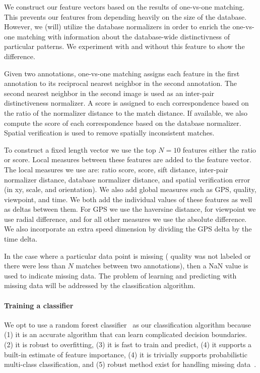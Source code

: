 We construct our feature vectors based on the results of one-vs-one matching.
This prevents our features from depending heavily on the size of the database.
However, we (will) utilize the database normalizers in order to enrich the
  one-vs-one matching with information about the database-wide distinctivness of
  particular patterns.
We experiment with and without this feature to show the difference.


Given two annotations, one-vs-one matching assigns each feature in the first
  annotation to its reciprocal nearest neighbor in the second annotation.
The second nearest neighbor in the second image is used as an inter-pair
  distinctiveness normalizer.
A score is assigned to each correspondence based on the ratio of the
  normalizer distance to the match distance.
If available, we also compute the \LNBNN{} score of each correspondence based
  on the database normalizer.
Spatial verification is used to remove spatially inconsistent matches.

To construct a fixed length vector we use the top $N=10$ features \wrt{}
  either the ratio or \LNBNN{} score.
Local measures between these features are added to the feature vector.
The local measures we use are:
ratio score, \LNBNN{} score, sift distance, inter-pair normalizer distance,
  database normalizer distance, and spatial verification error (in xy, scale,
  and orientation).
We also add global measures such as GPS, quality, viewpoint, and time.
We both add the individual values of these features as well as deltas between
  them.
For GPS we use the haversine distance, for viewpoint we use radial difference,
  and for all other measures we use the absolute difference.
We also incorporate an extra speed dimension by dividing the GPS delta by the
  time delta.

In the case where a particular data point is missing (\ie{} quality was not
  labeled or there were less than $N$ matches between two annotations), then a
  NaN value is used to indicate missing data.
The problem of learning and predicting with missing data will be addressed by
  the classification algorithm.


\paragraph{Training a classifier}
 
We opt to use a random forest
  classifier~\cite{ho_random_1995,amit_shape_1997,breiman_random_2001} as our
  classification algorithm because
(1) it is an accurate algorithm that can learn complicated decision
  boundaries.
(2) it is robust to overfitting,
(3) it is fast to train and predict,
(4) it supports a built-in estimate of feature importance,
(4) it is trivially supports probabilistic multi-class classification, and
(5) robust method exist for handling missing
  data~\cite{ding_investigation_2010}.

